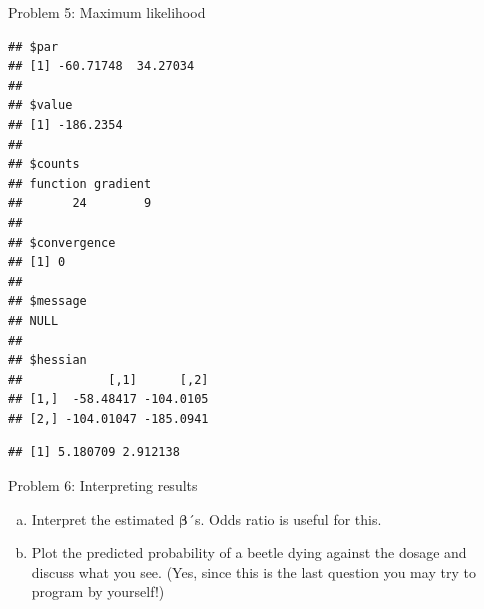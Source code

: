 \documentclass[
  ignorenonframetext,
]{beamer}
\newenvironment{Shaded}{\begin{snugshade}}{\end{snugshade}}
\newcommand{\AttributeTok}[1]{\textcolor[rgb]{0.13,0.29,0.53}{#1}}
\newcommand{\CommentTok}[1]{\textcolor[rgb]{0.56,0.35,0.01}{\textit{#1}}}
\newcommand{\ConstantTok}[1]{\textcolor[rgb]{0.56,0.35,0.01}{#1}}
\newcommand{\DecValTok}[1]{\textcolor[rgb]{0.00,0.00,0.81}{#1}}
\newcommand{\FunctionTok}[1]{\textcolor[rgb]{0.13,0.29,0.53}{\textbf{#1}}}
\newcommand{\NormalTok}[1]{#1}
\newcommand{\OtherTok}[1]{\textcolor[rgb]{0.56,0.35,0.01}{#1}}
\newcommand{\SpecialCharTok}[1]{\textcolor[rgb]{0.81,0.36,0.00}{\textbf{#1}}}
\newcommand{\StringTok}[1]{\textcolor[rgb]{0.31,0.60,0.02}{#1}}
\providecommand{\tightlist}{%
  \setlength{\itemsep}{0pt}\setlength{\parskip}{0pt}}
\begin{document}
\begin{frame}[fragile]
\begin{block}{Problem 5: Maximum likelihood}
\begin{Shaded}
\end{Shaded}

\begin{verbatim}
## $par
## [1] -60.71748  34.27034
## 
## $value
## [1] -186.2354
## 
## $counts
## function gradient 
##       24        9 
## 
## $convergence
## [1] 0
## 
## $message
## NULL
## 
## $hessian
##            [,1]      [,2]
## [1,]  -58.48417 -104.0105
## [2,] -104.01047 -185.0941
\end{verbatim}

\begin{Shaded}
\end{Shaded}

\begin{verbatim}
## [1] 5.180709 2.912138
\end{verbatim}
\end{block}
\end{frame}

\begin{frame}
\begin{block}{Problem 6: Interpreting results}
\protect\hypertarget{problem-6-interpreting-results}{}
\begin{enumerate}
[a)]
\tightlist
\item
  Interpret the estimated \(\boldsymbol{\beta}\)´s. Odds ratio is useful
  for this.
\item
  Plot the predicted probability of a beetle dying against the dosage
  and discuss what you see. (Yes, since this is the last question you
  may try to program by yourself!)
\end{enumerate}
\end{block}
\end{frame}
\end{document}
